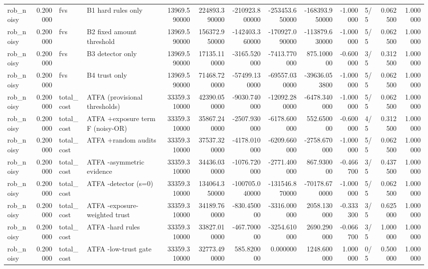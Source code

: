 \begin{tabular}{lrllrrrrrrlrr}
rob\_noisy & 0.200000 & fvs & B1 hard rules only & 13969.590000 & 224893.390000 & -210923.800000 & -253453.650000 & -168393.950000 & -1.000000 & 5/5 & 0.062500 & 1.000000 \\
rob\_noisy & 0.200000 & fvs & B2 fixed amount threshold & 13969.590000 & 156372.950000 & -142403.360000 & -170927.090000 & -113879.630000 & -1.000000 & 5/5 & 0.062500 & 1.000000 \\
rob\_noisy & 0.200000 & fvs & B3 detector only & 13969.590000 & 17135.110000 & -3165.520000 & -7413.770000 & 875.100000 & -0.600000 & 3/5 & 0.312500 & 1.000000 \\
rob\_noisy & 0.200000 & fvs & B4 trust only & 13969.590000 & 71468.720000 & -57499.130000 & -69557.030000 & -39636.053800 & -1.000000 & 5/5 & 0.062500 & 1.000000 \\
rob\_noisy & 0.200000 & total\_cost & ATFA (provisional thresholds) & 33359.310000 & 42390.050000 & -9030.740000 & -12092.280000 & -6478.340000 & -1.000000 & 5/5 & 0.062500 & 1.000000 \\
rob\_noisy & 0.200000 & total\_cost & ATFA +exposure term F (noisy-OR) & 33359.310000 & 35867.240000 & -2507.930000 & -6178.600000 & 552.650000 & -0.600000 & 4/5 & 0.312500 & 1.000000 \\
rob\_noisy & 0.200000 & total\_cost & ATFA +random audits & 33359.310000 & 37537.320000 & -4178.010000 & -6209.660000 & -2758.670000 & -1.000000 & 5/5 & 0.062500 & 1.000000 \\
rob\_noisy & 0.200000 & total\_cost & ATFA -asymmetric evidence & 33359.310000 & 34436.030000 & -1076.720000 & -2771.400000 & 867.930000 & -0.466700 & 3/5 & 0.437500 & 1.000000 \\
rob\_noisy & 0.200000 & total\_cost & ATFA -detector (s=0) & 33359.310000 & 134064.350000 & -100705.040000 & -131546.870000 & -70178.670000 & -1.000000 & 5/5 & 0.062500 & 1.000000 \\
rob\_noisy & 0.200000 & total\_cost & ATFA -exposure-weighted trust & 33359.310000 & 34189.760000 & -830.450000 & -3316.000000 & 2058.130000 & -0.333300 & 3/5 & 0.625000 & 1.000000 \\
rob\_noisy & 0.200000 & total\_cost & ATFA -hard rules & 33359.310000 & 33827.010000 & -467.700000 & -3254.610000 & 2690.290000 & -0.066700 & 3/5 & 1.000000 & 1.000000 \\
rob\_noisy & 0.200000 & total\_cost & ATFA -low-trust gate & 33359.310000 & 32773.490000 & 585.820000 & 0.000000 & 1248.600000 & 1.000000 & 0/5 & 0.500000 & 1.000000 \\

\end{tabular}
